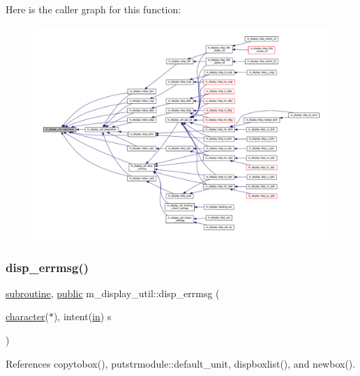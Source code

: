Here is the caller graph for this function\+:
\nopagebreak
\begin{figure}[H]
\begin{center}
\leavevmode
\includegraphics[width=350pt]{namespacem__display__util_aca56756281a372cd4d186a032dd426fb_icgraph}
\end{center}
\end{figure}
\mbox{\label{namespacem__display__util_a6bfbf2a614c2b0e059d5399eb8dda479}} 
\subsubsection{\texorpdfstring{disp\+\_\+errmsg()}{disp\_errmsg()}}
{\footnotesize\ttfamily \hyperlink{M__stopwatch_83_8txt_acfbcff50169d691ff02d4a123ed70482}{subroutine}, \hyperlink{M__stopwatch_83_8txt_a2f74811300c361e53b430611a7d1769f}{public} m\+\_\+display\+\_\+util\+::disp\+\_\+errmsg (\begin{DoxyParamCaption}\item[{\hyperlink{option__stopwatch_83_8txt_abd4b21fbbd175834027b5224bfe97e66}{character}($\ast$), intent(\hyperlink{M__journal_83_8txt_afce72651d1eed785a2132bee863b2f38}{in})}]{s }\end{DoxyParamCaption})}



References copytobox(), putstrmodule\+::default\+\_\+unit, dispboxlist(), and newbox().

